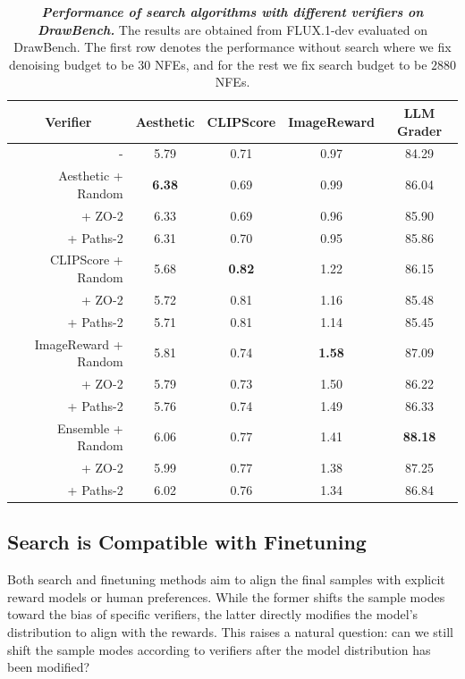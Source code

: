 \begin{table}[t!]
\centering
\scalebox{0.85}
{

\begin{tabular}{rcccc}
\toprule

\multicolumn{1}{c}{\textbf{Verifier}} & Aesthetic & CLIPScore & ImageReward & LLM Grader \\
\midrule
- & 5.79 & 0.71 & 0.97 & 84.29 \\
\midrule
Aesthetic + Random & \textbf{6.38} & 0.69 & 0.99 & 86.04 \\
          + ZO-2 & 6.33 & 0.69 & 0.96 & 85.90\\
          + Paths-2 & 6.31 & 0.70	& 0.95 & 85.86\\
\midrule
CLIPScore + Random & 5.68	& \textbf{0.82} & 1.22 & 86.15 \\
          + ZO-2 & 5.72 &  0.81 & 1.16 & 85.48\\
          + Paths-2 & 5.71 & 0.81 & 1.14 & 85.45\\
\midrule
ImageReward + Random & 5.81 & 0.74 & \textbf{1.58} &  87.09 \\
            + ZO-2 & 5.79	& 0.73 & 1.50 & 86.22\\
            + Paths-2 & 5.76 & 0.74 & 1.49	& 86.33\\
\midrule
Ensemble + Random & 6.06 & 0.77 & 1.41 & \textbf{88.18}\\
         + ZO-2 & 5.99 & 0.77 & 1.38 & 87.25\\
         + Paths-2 & 6.02 & 0.76	& 1.34 & 86.84\\
\bottomrule
\end{tabular}
}
\caption{\footnotesize{\textbf{\emph{Performance of search algorithms with different verifiers on DrawBench.}} The results are obtained from FLUX.1-dev evaluated on DrawBench. The first row denotes the performance without search where we fix denoising budget to be $30$ NFEs, and for the rest we fix search budget to be $2880$ NFEs.}}
\label{tab:algo-draw-bench}
\vspace{-0.5cm}
\end{table}


\vspace{-0.5cm}
\subsection{Search is Compatible with Finetuning}
\label{sec:search-finetune}
\vspace{-0.2cm}


Both search and finetuning methods \citep{clark2024directly, fan2024reinforcement} aim to align the final samples with explicit reward models or human preferences. While the former shifts the sample modes toward the bias of specific verifiers, the latter directly modifies the model's distribution to align with the rewards. This raises a natural question: can we still shift the sample modes according to verifiers after the model distribution has been modified?


